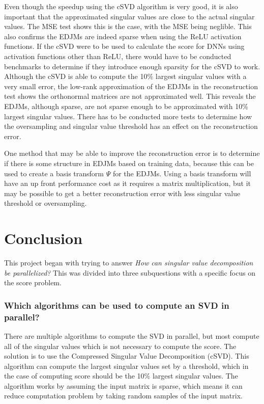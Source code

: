Even though the speedup using the cSVD algorithm is very good, it is also important that the approximated singular values are close to the actual singular values. The MSE test shows this is the case, with the MSE being neglible. This also confirms the EDJMs are indeed sparse when using the ReLU activation functions. If the cSVD were to be used to calculate the score for DNNs using activation functions other than ReLU, there would have to be conducted benchmarks to determine if they introduce enough sparsity for the cSVD to work. Although the cSVD is able to compute the 10\% largest singular values with a very small error, the low-rank approximation of the EDJMs in the reconstruction test shows the orthonormal matrices are not approximated well. This reveals the EDJMs, although sparse, are not sparse enough to be approximated with 10\% largest singular values. There has to be conducted more tests to determine how the oversampling and singular value threshold has an effect on the reconstruction error.

One method that may be able to improve the reconstruction error is to determine if there is some structure in EDJMs based on training data, because this can be used to create a basis transform $\Psi$ for the EDJMs. Using a basis transform will have an up front performance cost as it requires a matrix multiplication, but it may be possible to get a better reconstruction error with less singular value threshold or oversampling.

\newpage

\section{Conclusion}

This project began with trying to answer \textit{How can singular value decomposition be parallelized?} This was divided into three subquestions with a specific focus on the score problem.

\subsubsection*{Which algorithms can be used to compute an SVD in parallel?}

There are multiple algorithms to compute the SVD in parallel, but most compute all of the singular values which is not necessary to compute the score. The solution is to use the Compressed Singular Value Decomposition (cSVD). This algorithm can compute the largest singular values set by a threshold, which in the case of computing score should be the 10\% largest singular values. The algorithm works by assuming the input matrix is sparse, which means it can reduce computation problem by taking random samples of the input matrix.

